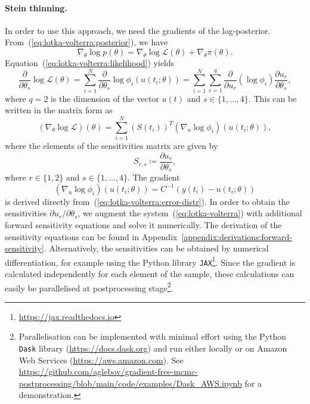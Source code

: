 \documentclass[11pt,a4paper]{report}
\begin{document}
\paragraph{Stein thinning.} In order to use this approach, we need the gradients of the log-posterior. From~(\ref{eq:lotka-volterra:posterior}), we have
\begin{equation*}
\nabla_{\theta} \log p(\theta) = \nabla_{\theta} \log \mathcal{L}(\theta) + \nabla_{\theta} \pi(\theta).
\end{equation*}
Equation~(\ref{eq:lotka-volterra:likelihood}) yields
\begin{equation*}
\frac{\partial}{\partial \theta_s} \log \mathcal{L}(\theta) 
= \sum_{i=1}^N \frac{\partial}{\partial \theta_s} \log \phi_i(u(t_i; \theta))
= \sum_{i=1}^N \sum_{r=1}^q \frac{\partial}{\partial u_r} (\log \phi_i) \frac{\partial u_r}{\partial \theta_s},
\end{equation*}
where $q = 2$ is the dimension of the vector $u(t)$ and $s \in \{1, \dots, 4\}$. This can be written in the matrix form as
\begin{equation*}
(\nabla_{\theta} \log \mathcal{L})(\theta) = \sum_{i=1}^N (S(t_i))^T (\nabla_{u} \log \phi_i)(u(t_i; \theta)),
\end{equation*}
where the elements of the sensitivities matrix are given by
\begin{equation*}
S_{r,s} \coloneq \frac{\partial u_r}{\partial \theta_s},
\end{equation*}
where $r \in \{1, 2\}$ and $s \in \{1, \dots, 4\}$.
The gradient
\begin{equation*}
(\nabla_u \log \phi_i)(u(t_i; \theta)) = C^{-1}(y(t_i) - u(t_i; \theta))
\end{equation*}
is derived directly from~(\ref{eq:lotka-volterra:error-distr}). In order to obtain the sensitivities $\partial u_r / \partial \theta_s$, we augment the system~(\ref{eq:lotka-volterra}) with additional forward sensitivity equations and solve it numerically. The derivation of the sensitivity equations can be found in Appendix~\ref{appendix:derivations:forward-sensitivity}. Alternatively, the sensitivities can be obtained by numerical differentiation, for example using the Python library \texttt{JAX}\footnote{\url{https://jax.readthedocs.io}}. Since the gradient is calculated independently for each element of the sample, these calculations can easily be parallelised at postprocessing stage\footnote{Parallelisation can be implemented with minimal effort using the Python \texttt{Dask} library (\url{https://docs.dask.org}) and run either locally or on Amazon Web Services (\url{https://aws.amazon.com}). See \url{https://github.com/aglebov/gradient-free-mcmc-postprocessing/blob/main/code/examples/Dask_AWS.ipynb} for a demonstration.}.
\end{document}
